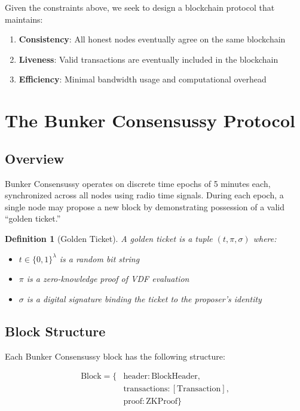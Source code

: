 \documentclass[11pt,a4paper]{article}
\newtheorem{definition}[theorem]{Definition}
\begin{document}
Given the constraints above, we seek to design a blockchain protocol that maintains:

\begin{enumerate}
\item \textbf{Consistency}: All honest nodes eventually agree on the same blockchain
\item \textbf{Liveness}: Valid transactions are eventually included in the blockchain
\item \textbf{Efficiency}: Minimal bandwidth usage and computational overhead
\end{enumerate}

\section{The Bunker Consensussy Protocol}

\subsection{Overview}

Bunker Consensussy operates on discrete time epochs of 5 minutes each, synchronized across all nodes using radio time signals. During each epoch, a single node may propose a new block by demonstrating possession of a valid ``golden ticket.''

\begin{definition}[Golden Ticket]
A golden ticket is a tuple $(t, \pi, \sigma)$ where:
\begin{itemize}
\item $t \in \{0,1\}^{\lambda}$ is a random bit string
\item $\pi$ is a zero-knowledge proof of VDF evaluation
\item $\sigma$ is a digital signature binding the ticket to the proposer's identity
\end{itemize}
\end{definition}

\subsection{Block Structure}

Each Bunker Consensussy block has the following structure:

\begin{align}
\text{Block} = \{&\text{header}: \text{BlockHeader},\\
&\text{transactions}: [\text{Transaction}],\\
&\text{proof}: \text{ZKProof}\}
\end{align}
\end{document}
